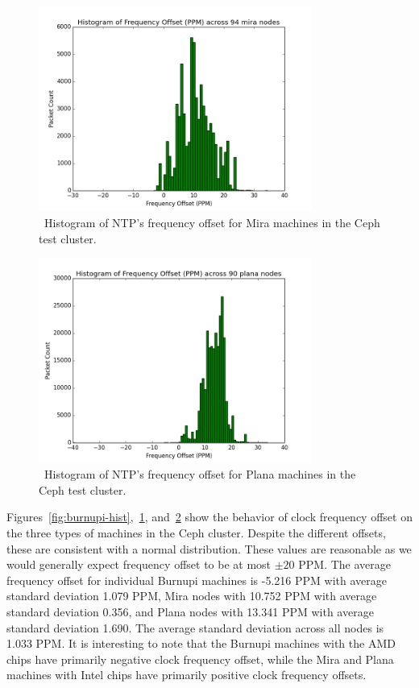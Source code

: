 \begin{figure}[!htbp]
  \centering
  \caption{~Histogram of NTP's frequency offset for Mira machines in the Ceph test cluster.}
  \label{fig:mira-hist}
  \includegraphics[width=0.8\textwidth]{mira-freq-offset.png}
\end{figure}

\begin{figure}[!htbp]
  \centering
  \caption{~Histogram of NTP's frequency offset for Plana machines in the Ceph test cluster.}
  \label{fig:plana-hist}
  \includegraphics[width=0.8\textwidth]{plana-freq-offset.png}
\end{figure}

Figures~\ref{fig:burnupi-hist},~\ref{fig:mira-hist},
and~\ref{fig:plana-hist} show the behavior of clock frequency offset
on the three types of machines in the Ceph cluster. Despite the different offsets, 
these are consistent with a normal distribution. These values are reasonable 
as we would generally expect frequency offset to be at most $\pm 20$ PPM. 
The average frequency offset for individual Burnupi machines is -5.216 PPM with 
average standard deviation 1.079 PPM, Mira nodes with 10.752 PPM with average
standard deviation 0.356, and Plana nodes with 13.341 PPM with average standard deviation 1.690. The average standard deviation across all nodes is
1.033 PPM. It is interesting to note that the Burnupi machines with 
the AMD chips have primarily negative clock frequency offset, while the 
Mira and Plana machines with Intel chips have primarily positive 
clock frequency offsets.



